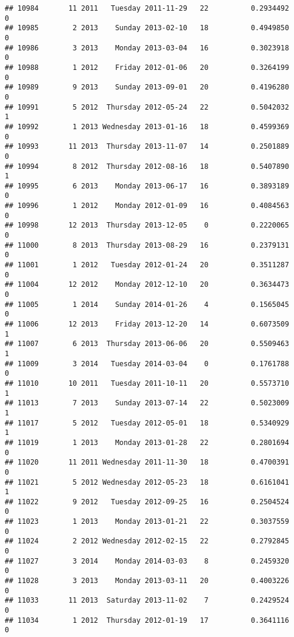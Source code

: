 \documentclass[
]{article}
\begin{document}
\begin{verbatim}
## 10984       11 2011   Tuesday 2011-11-29   22          0.2934492             0
## 10985        2 2013    Sunday 2013-02-10   18          0.4949850             0
## 10986        3 2013    Monday 2013-03-04   16          0.3023918             0
## 10988        1 2012    Friday 2012-01-06   20          0.3264199             0
## 10989        9 2013    Sunday 2013-09-01   20          0.4196280             0
## 10991        5 2012  Thursday 2012-05-24   22          0.5042032             1
## 10992        1 2013 Wednesday 2013-01-16   18          0.4599369             0
## 10993       11 2013  Thursday 2013-11-07   14          0.2501889             0
## 10994        8 2012  Thursday 2012-08-16   18          0.5407890             1
## 10995        6 2013    Monday 2013-06-17   16          0.3893189             0
## 10996        1 2012    Monday 2012-01-09   16          0.4084563             0
## 10998       12 2013  Thursday 2013-12-05    0          0.2220065             0
## 11000        8 2013  Thursday 2013-08-29   16          0.2379131             0
## 11001        1 2012   Tuesday 2012-01-24   20          0.3511287             0
## 11004       12 2012    Monday 2012-12-10   20          0.3634473             0
## 11005        1 2014    Sunday 2014-01-26    4          0.1565045             0
## 11006       12 2013    Friday 2013-12-20   14          0.6073509             1
## 11007        6 2013  Thursday 2013-06-06   20          0.5509463             1
## 11009        3 2014   Tuesday 2014-03-04    0          0.1761788             0
## 11010       10 2011   Tuesday 2011-10-11   20          0.5573710             1
## 11013        7 2013    Sunday 2013-07-14   22          0.5023009             1
## 11017        5 2012   Tuesday 2012-05-01   18          0.5340929             1
## 11019        1 2013    Monday 2013-01-28   22          0.2801694             0
## 11020       11 2011 Wednesday 2011-11-30   18          0.4700391             0
## 11021        5 2012 Wednesday 2012-05-23   18          0.6161041             1
## 11022        9 2012   Tuesday 2012-09-25   16          0.2504524             0
## 11023        1 2013    Monday 2013-01-21   22          0.3037559             0
## 11024        2 2012 Wednesday 2012-02-15   22          0.2792845             0
## 11027        3 2014    Monday 2014-03-03    8          0.2459320             0
## 11028        3 2013    Monday 2013-03-11   20          0.4003226             0
## 11033       11 2013  Saturday 2013-11-02    7          0.2429524             0
## 11034        1 2012  Thursday 2012-01-19   17          0.3641116             0

\end{verbatim}
\end{document}
